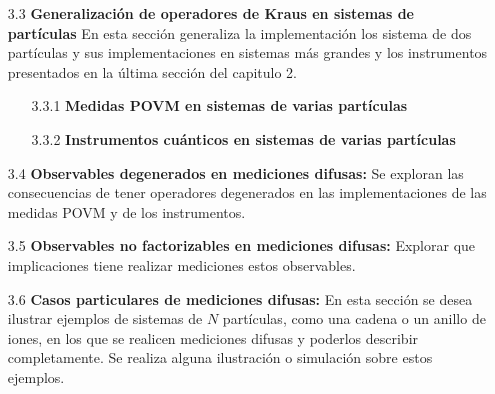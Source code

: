 \documentclass[12pt,oneside]{book}\raggedbottom{} %
\begin{document}
\begin{sloppypar}
{{\begin{itemize}
\begin{itemize}
    {Se detallan algunas implementaciones de los operadores POVM\@. Se agregan más de una implementación de efectos en esta sección}
    \item[3.2.2] \textbf{Instrumentos cuánticos para dos partículas:}
{Se expone la dos alternativa estudiadas de los instrumentos cuánticos, en sistemas simples de dos partículas y con observables factorizables. }{Se obtiene su valor esperado.}
\item[3.2.3]\textbf{{Equivalencia de los instrumentos}:}
Se hace una comparación entre los instrumentos anteriores y se expone por qué resultaron no ser equivalentes. En esta sección se comenta que se esperaba que los instrumentos fueran equivalentes pero resultaron distintos y por ello vale la pena proponer en qué condiciones sí lo son.
\item[3.2.4] \textbf{Ejemplos sobre los efectos de una medición difusa:}
Se describen algunos ejemplos con estados iniciales y observables particulares de una medición difusa en un sistema de dos partículas.
  \end{itemize}

 
  \item[3.3 ] \textbf{Generalización de operadores de Kraus en sistemas de \texorpdfstring{}{N} partículas}
  En esta sección generaliza la implementación los sistema de dos partículas y sus implementaciones en sistemas más grandes y los instrumentos presentados en la última sección del capitulo 2.

\begin{itemize}
  \item[3.3.1] \textbf{Medidas POVM en sistemas de varias partículas}
  \item[3.3.2] \textbf{Instrumentos cuánticos en sistemas de varias partículas} 
\end{itemize}

\item[3.4]\textbf{Observables degenerados en mediciones difusas:} 
Se exploran  las consecuencias de tener operadores degenerados en las implementaciones de las medidas POVM y de los instrumentos.

\item[3.5] \textbf{Observables no factorizables en mediciones difusas:} Explorar que implicaciones tiene realizar mediciones estos observables.

\item[3.6] \textbf{Casos particulares de mediciones difusas:} {En esta sección se desea ilustrar ejemplos de sistemas de $N$ partículas, como una cadena o un anillo de iones,  en los que se realicen mediciones difusas y poderlos describir completamente.} { Se realiza alguna ilustración o simulación sobre estos ejemplos.}




\end{itemize}}}
\end{sloppypar}
\end{document}
